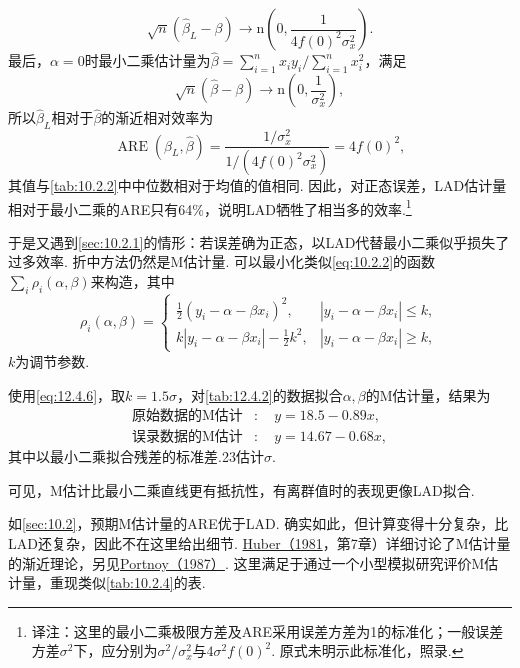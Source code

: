 \begin{example}[LAD估计量的渐近正态性]
\begin{equation}
\sqrt n(\hat\beta_L-\beta)\to\mathrm n\left(0,\frac1{4f(0)^2\sigma_x^2}\right).
\end{equation}
最后，$\alpha=0$时最小二乘估计量为$\hat\beta=\sum_{i=1}^nx_iy_i/\sum_{i=1}^nx_i^2$，满足
$$\sqrt n(\hat\beta-\beta)\to\mathrm n\left(0,\frac1{\sigma_x^2}\right),$$
所以$\hat\beta_L$相对于$\hat\beta$的渐近相对效率为
$$\operatorname{ARE}(\hat\beta_L,\hat\beta)=\frac{1/\sigma_x^2}{1/(4f(0)^2\sigma_x^2)}=4f(0)^2,$$
其值与\autoref{tab:10.2.2}中中位数相对于均值的值相同. 因此，对正态误差，LAD估计量相对于最小二乘的ARE只有64\%，说明LAD牺牲了相当多的效率.\footnote{译注：这里的最小二乘极限方差及ARE采用误差方差为1的标准化；一般误差方差$\sigma^2$下，应分别为$\sigma^2/\sigma_x^2$与$4\sigma^2f(0)^2$. 原式未明示此标准化，照录.}
\end{example}
于是又遇到\autoref{sec:10.2.1}的情形：若误差确为正态，以LAD代替最小二乘似乎损失了过多效率. 折中方法仍然是M估计量. 可以最小化类似\eqref{eq:10.2.2}的函数$\sum_i\rho_i(\alpha,\beta)$来构造，其中
\begin{equation}\label{eq:12.4.6}
\rho_i(\alpha,\beta)=\begin{cases}
\tfrac12(y_i-\alpha-\beta x_i)^2,&|y_i-\alpha-\beta x_i|\le k,\\
k|y_i-\alpha-\beta x_i|-\tfrac12k^2,&|y_i-\alpha-\beta x_i|\ge k,
\end{cases}
\end{equation}
$k$为调节参数.

\begin{example}[回归M估计量]\label{ex:12.4.4}
使用\eqref{eq:12.4.6}，取$k=1.5\sigma$，对\autoref{tab:12.4.2}的数据拟合$\alpha,\beta$的M估计量，结果为
$$\begin{aligned}\text{原始数据的M估计}&:\quad y=18.5-0.89x,\\
\text{误录数据的M估计}&:\quad y=14.67-0.68x,
\end{aligned}$$
其中以最小二乘拟合残差的标准差.23估计$\sigma$.

可见，M估计比最小二乘直线更有抵抗性，有离群值时的表现更像LAD拟合.
\end{example}

如\autoref{sec:10.2}，预期M估计量的ARE优于LAD. 确实如此，但计算变得十分复杂，比LAD还复杂，因此不在这里给出细节. \hyperref[bib:source171]{Huber（1981}，第7章）详细讨论了M估计量的渐近理论，另见\hyperref[bib:source243]{Portnoy（1987）}. 这里满足于通过一个小型模拟研究评价M估计量，重现类似\autoref{tab:10.2.4}的表.

